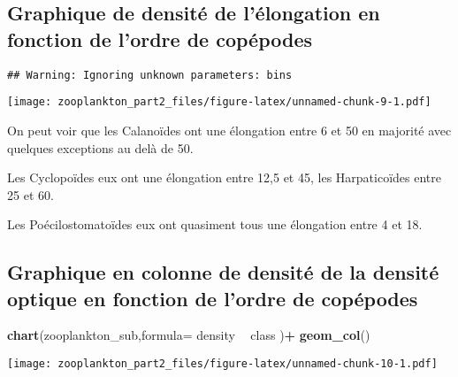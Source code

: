 \documentclass[]{article}
\newenvironment{Shaded}{\begin{snugshade}}{\end{snugshade}}
\newcommand{\KeywordTok}[1]{\textcolor[rgb]{0.13,0.29,0.53}{\textbf{#1}}}
\newcommand{\DataTypeTok}[1]{\textcolor[rgb]{0.13,0.29,0.53}{#1}}
\newcommand{\DecValTok}[1]{\textcolor[rgb]{0.00,0.00,0.81}{#1}}
\newcommand{\StringTok}[1]{\textcolor[rgb]{0.31,0.60,0.02}{#1}}
\newcommand{\OperatorTok}[1]{\textcolor[rgb]{0.81,0.36,0.00}{\textbf{#1}}}
\newcommand{\NormalTok}[1]{#1}
\begin{document}
\subsection{Graphique de densité de l'élongation en fonction de l'ordre
de
copépodes}\label{graphique-de-densite-de-lelongation-en-fonction-de-lordre-de-copepodes}

\begin{Shaded}
\end{Shaded}

\begin{verbatim}
## Warning: Ignoring unknown parameters: bins
\end{verbatim}

\texttt{[image: zooplankton\_part2\_files/figure-latex/unnamed-chunk-9-1.pdf]}

On peut voir que les Calanoïdes ont une élongation entre 6 et 50 en
majorité avec quelques exceptions au delà de 50.

Les Cyclopoïdes eux ont une élongation entre 12,5 et 45, les
Harpaticoïdes entre 25 et 60.

Les Poécilostomatoïdes eux ont quasiment tous une élongation entre 4 et
18.

\subsection{Graphique en colonne de densité de la densité optique en
fonction de l'ordre de
copépodes}\label{graphique-en-colonne-de-densite-de-la-densite-optique-en-fonction-de-lordre-de-copepodes}

\begin{Shaded}
\begin{Highlighting}[]
\KeywordTok{chart}\NormalTok{(zooplankton_sub,}\DataTypeTok{formula=}\NormalTok{ density }\OperatorTok{~}\StringTok{ }\NormalTok{class  )}\OperatorTok{+}\StringTok{ }
\StringTok{  }\KeywordTok{geom_col}\NormalTok{()}
\end{Highlighting}
\end{Shaded}

\texttt{[image: zooplankton\_part2\_files/figure-latex/unnamed-chunk-10-1.pdf]}
\end{document}
